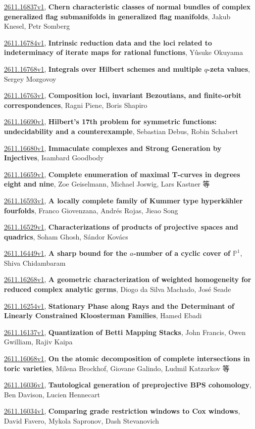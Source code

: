 \documentclass[9pt, a4paper]{article}
\theoremstyle{plain}
\theoremstyle{definition}
\theoremstyle{remark}
\newcommand{\arxiv}[3]{\href{https://arxiv.org/abs/#1}{#1}, \textbf{\textcolor{arxivblue}{#2}}, #3}
\begin{document}
\arxiv{2611.16837v1}{Chern characteristic classes of normal bundles of complex generalized flag submanifolds in generalized flag manifolds}{Jakub Knesel, Petr Somberg}

\arxiv{2611.16784v1}{Intrinsic reduction data and the loci related to indeterminacy of iterate maps for rational functions}{Yûsuke Okuyama}

\arxiv{2611.16768v1}{Integrals over Hilbert schemes and multiple $q$-zeta values}{Sergey Mozgovoy}

\arxiv{2611.16763v1}{Composition loci, invariant Bezoutians, and finite-orbit correspondences}{Ragni Piene, Boris Shapiro}

\arxiv{2611.16690v1}{Hilbert's 17th problem for symmetric functions: undecidability and a counterexample}{Sebastian Debus, Robin Schabert}

\arxiv{2611.16680v1}{Immaculate complexes and Strong Generation by Injectives}{Isambard Goodbody}

\arxiv{2611.16659v1}{Complete enumeration of maximal T-curves in degrees eight and nine}{Zoe Geiselmann, Michael Joswig, Lars Kastner 等}

\arxiv{2611.16593v1}{A locally complete family of Kummer type hyperkähler fourfolds}{Franco Giovenzana, Andrés Rojas, Jieao Song}

\arxiv{2611.16529v1}{Characterizations of products of projective spaces and quadrics}{Soham Ghosh, Sándor Kovács}

\arxiv{2611.16449v1}{A sharp bound for the $a$-number of a cyclic cover of $\mathbb{P}^1$}{Shiva Chidambaram}

\arxiv{2611.16268v1}{A geometric characterization of weighted homogeneity for reduced complex analytic germs}{Diogo da Silva Machado, José Seade}

\arxiv{2611.16254v1}{Stationary Phase along Rays and the Determinant of Linearly Constrained Kloosterman Families}{Hamed Ebadi}

\arxiv{2611.16137v1}{Quantization of Betti Mapping Stacks}{John Francis, Owen Gwilliam, Rajiv Kaipa}

\arxiv{2611.16068v1}{On the atomic decomposition of complete intersections in toric varieties}{Milena Brockhof, Giovane Galindo, Ludmil Katzarkov 等}

\arxiv{2611.16036v1}{Tautological generation of preprojective BPS cohomology}{Ben Davison, Lucien Hennecart}

\arxiv{2611.16034v1}{Comparing grade restriction windows to Cox windows}{David Favero, Mykola Sapronov, Dash Stevanovich}
\end{document}
